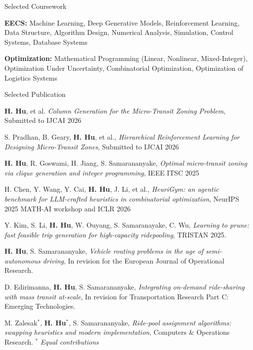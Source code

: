 \documentclass{resume} %
\begin{document}
\begin{rSection}{Selected Coursework}
\item \textbf{EECS:} Machine Learning, Deep Generative Models, Reinforcement Learning, Data Structure, Algorithm Design, Numerical Analysis, Simulation, Control Systems, Database Systems
\item \textbf{Optimization:} Mathematical Programming (Linear, Nonlinear, Mixed-Integer), Optimization Under Uncertainty, Combinatorial Optimization, Optimization of Logistics Systems
\end{rSection}

\begin{rSection}{Selected Publication}
\item \textbf{H. Hu}, et al. \textit{Column Generation for the Micro-Transit Zoning Problem}, Submitted to IJCAI 2026

\item S. Pradhan, B. Geary, \textbf{H. Hu}, et al., \textit{Hierarchical Reinforcement Learning for Designing Micro-Transit Zones}, Submitted to IJCAI 2026

\item \textbf{H. Hu}, R. Goswami, H. Jiang, S. Samarananyake, \textit{Optimal micro-transit zoning via clique
generation and integer programming}, IEEE ITSC 2025

\item H. Chen, Y. Wang, Y. Cai, \textbf{H. Hu}, J. Li, et al., \textit{HeuriGym: an agentic benchmark for LLM-crafted heuristics in combinatorial optimization}, NeurIPS 2025 MATH-AI workshop and ICLR 2026

\item Y. Kim, S. Li, \textbf{H. Hu}, W. Ouyang, S. Samaranayake, C. Wu, \textit{Learning to prune: fast feasible trip generation for high-capacity ridepooling}, TRISTAN 2025.

\item \textbf{H. Hu}, S. Samarananyake, \textit{Vehicle routing problems in the age of semi-autonomous driving}, In revision for the European Journal of Operational Research.

\item D. Edirimanna, \textbf{H. Hu}, S. Samarananyake, \textit{Integrating on-demand ride-sharing with mass transit at-scale}, In revision for Transportation Research Part C: Emerging Technologies.
\item M. Zalesak{$^*$}, \textbf{H. Hu}{$^*$}, S. Samarananyake, \textit{Ride-pool assignment algorithms: swapping heuristics and modern implementation}, Computers \& Operations Research. $^*$ \textit{Equal contributions}
\end{rSection}
\end{document}
